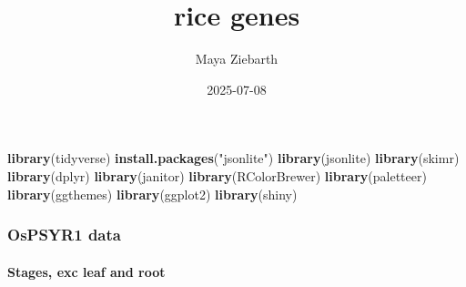 \documentclass[
]{article}
\title{rice genes}
\author{Maya Ziebarth}
\date{2025-07-08}
\newenvironment{Shaded}{\begin{snugshade}}{\end{snugshade}}
\newcommand{\FunctionTok}[1]{\textcolor[rgb]{0.13,0.29,0.53}{\textbf{#1}}}
\newcommand{\NormalTok}[1]{#1}
\newcommand{\StringTok}[1]{\textcolor[rgb]{0.31,0.60,0.02}{#1}}
\begin{document}
\maketitle

\begin{Shaded}
\begin{Highlighting}[]
\FunctionTok{library}\NormalTok{(tidyverse)}
\FunctionTok{install.packages}\NormalTok{(}\StringTok{"jsonlite"}\NormalTok{)}
\FunctionTok{library}\NormalTok{(jsonlite)}
\FunctionTok{library}\NormalTok{(skimr)}
\FunctionTok{library}\NormalTok{(dplyr)}
\FunctionTok{library}\NormalTok{(janitor)}
\FunctionTok{library}\NormalTok{(RColorBrewer)}
\FunctionTok{library}\NormalTok{(paletteer)}
\FunctionTok{library}\NormalTok{(ggthemes)}
\FunctionTok{library}\NormalTok{(ggplot2)}
\FunctionTok{library}\NormalTok{(shiny)}
\end{Highlighting}
\end{Shaded}

\subsubsection{OsPSYR1 data}\label{ospsyr1-data}

\paragraph{Stages, exc leaf and root}\label{stages-exc-leaf-and-root}
\end{document}
